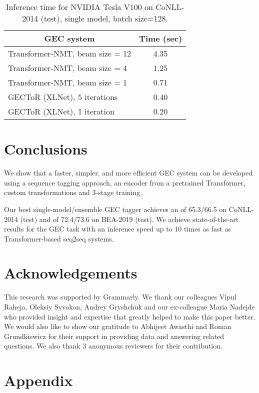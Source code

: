 \documentclass[11pt,a4paper]{article}
\begin{document}
\begin{table}[ht]
\footnotesize
\centering
\begin{tabular}{l|c}
\hline
\multicolumn{1}{c|}{\textbf{GEC system}}     &  \textbf{Time (sec)} \\ \hline
Transformer-NMT, beam size = 12 &  4.35   \\
Transformer-NMT, beam size = 4   &  1.25   \\
Transformer-NMT, beam size = 1   &   0.71  \\ \hline
GECToR (XLNet), 5 iterations &  0.40           \\
GECToR (XLNet), 1 iteration &  0.20           \\ \hline
\end{tabular}
\caption{\label{speed-table} Inference time for NVIDIA Tesla V100 on CoNLL-2014 (test), single model, batch size=128.}
\end{table}

\section{Conclusions}
We show that a faster, simpler, and more efficient GEC system can be developed using a sequence tagging approach, an encoder from a pretrained Transformer, custom transformations and 3-stage training. 

Our best single-model/ensemble GEC tagger achieves an  of 65.3/66.5 on CoNLL-2014 (test) and  of 72.4/73.6 on BEA-2019 (test). We achieve state-of-the-art results for the GEC task with an inference speed up to 10 times as fast as Transformer-based seq2seq systems.

\section{Acknowledgements}
This research was supported by Grammarly. We thank our colleagues Vipul Raheja, Oleksiy Syvokon, Andrey Gryshchuk and our ex-colleague Maria Nadejde who provided insight and expertise that greatly helped to make this paper better. We would also like to show our gratitude to Abhijeet Awasthi and Roman Grundkiewicz for their support in providing data and answering related questions. We also thank 3 anonymous reviewers for their contribution. 





\newpage
\onecolumn
\appendix
\section{Appendix}
\newcommand{\specialcell}[2][c]{\begin{tabular}[#1]{@{}c@{}}#2 \end{tabular}}
\end{document}
